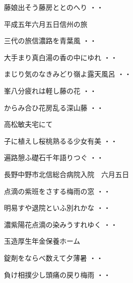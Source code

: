 \begin{shiika}藤娘出そう藤房ととのへり
\hfill{・・}\end{shiika}
\vspace{0.6cm}
平成五年六月五日信州の旅
\begin{shiika}三代の旅信濃路を青葉風
\hfill{・・}\end{shiika}
\begin{shiika}大手まり真白湯の香の中にゆれ
\hfill{・・}\end{shiika}
\begin{shiika}まじり気のなきみどり嶺よ露天風呂
\hfill{・・}\end{shiika}
\begin{shiika}峯八分疲れは軽し藤の花
\hfill{・・}\end{shiika}
\begin{shiika}からみ合ひ花房乱る深山藤
\hfill{・・}\end{shiika}
\vspace{0.6cm}
高松敏夫宅にて
\begin{shiika}子に植えし桜桃熟るる少女有美
\hfill{・・}\end{shiika}
\begin{shiika}遍路憩ふ礎石千年語りつぐ
\hfill{・・}\end{shiika}
\vspace{0.6cm}
長野中野市北信総合病院入院　六月五日
\begin{shiika}点滴の紫班をさする梅雨の窓
\hfill{・・}\end{shiika}
\begin{shiika}明易すや退院といふ別れかな
\hfill{・・}\end{shiika}
\begin{shiika}濃紫陽花点滴の染みうすれゆく
\hfill{・・}\end{shiika}
\vspace{0.6cm}
玉造厚生年金保養ホーム
\begin{shiika}錠剤をならべ数えて夕薄暑
\hfill{・・}\end{shiika}
\begin{shiika}負け相撲少し頭痛の戻り梅雨
\hfill{・・}\end{shiika}
